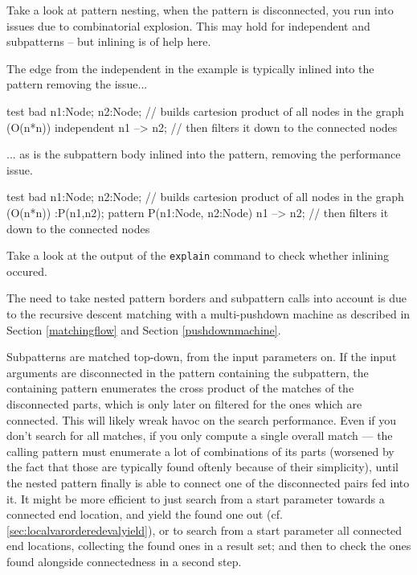 \begin{example}
Take a look at pattern nesting, when the pattern is disconnected, you run into issues due to combinatorial explosion.
This may hold for independent and subpatterns -- but inlining is of help here.

The edge from the independent in the example is typically inlined into the pattern removing the issue...
\begin{grgen}
test bad {
	n1:Node; n2:Node; // builds cartesion product of all nodes in the graph (O(n*n))
  independent {
		n1 --> n2; // then filters it down to the connected nodes
  }
}
\end{grgen}
... as is the subpattern body inlined into the pattern, removing the performance issue.
\begin{grgen}
test bad {
	n1:Node; n2:Node; // builds cartesion product of all nodes in the graph (O(n*n))
  :P(n1,n2);
}
pattern P(n1:Node, n2:Node) {
	n1 --> n2; // then filters it down to the connected nodes
}
\end{grgen}
Take a look at the output of the \texttt{explain} command to check whether inlining occured.
\end{example}

The need to take nested pattern borders and subpattern calls into account is due to the recursive descent matching with a multi-pushdown machine as described in Section \ref{matchingflow} and Section \ref{pushdownmachine}.

Subpatterns are matched top-down, from the input parameters on.
If the input arguments are disconnected in the pattern containing the subpattern, the containing pattern enumerates the cross product of the matches of the disconnected parts, which is only later on filtered for the ones which are connected.
This will likely wreak havoc on the search performance.
Even if you don't search for all matches, if you only compute a single overall match --- the calling pattern must enumerate a lot of combinations of its parts (worsened by the fact that those are typically found oftenly because of their simplicity), until the nested pattern finally is able to connect one of the disconnected pairs fed into it.
It might be more efficient to just search from a start parameter towards a connected end location, and yield the found one out (cf. \ref{sec:localvarorderedevalyield}), or to search from a start parameter all connected end locations, collecting the found ones in a result set; and then to check the ones found alongside connectedness in a second step.

